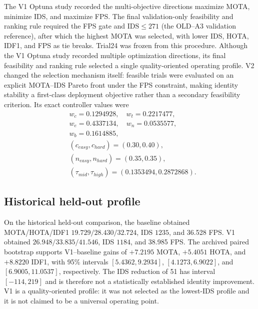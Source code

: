 The V1 Optuna study recorded the multi-objective directions maximize MOTA,
minimize IDS, and maximize FPS. The final validation-only feasibility and
ranking rule required the FPS gate and $\mathrm{IDS}\leq271$ (the OLD--A3
validation reference), after which the highest MOTA was selected, with lower
IDS, HOTA, IDF1, and FPS as tie breaks. Trial24 was frozen from this procedure.
Although the V1 Optuna study recorded multiple optimization directions, its
final feasibility and ranking rule selected a single quality-oriented operating
profile. V2 changed the selection mechanism itself: feasible trials were
evaluated on an explicit MOTA--IDS Pareto front under the FPS constraint,
making identity stability a first-class deployment objective rather than a
secondary feasibility criterion. Its exact controller values
were
\begin{equation*}
\begin{split}
&w_c=0.1294928,\quad w_t=0.2217477,\\
&w_e=0.4337134,\quad w_n=0.0535577,\\
&w_b=0.1614885,\\
&(c_{easy},c_{hard})=(0.30,0.40),\\
&(n_{easy},n_{hard})=(0.35,0.35),\\
&(\tau_{mid},\tau_{high})=(0.1353494,0.2872868).
\end{split}
\end{equation*}

\subsection{Historical held-out profile}
On the historical held-out comparison, the baseline obtained MOTA/HOTA/IDF1
$19.729/28.430/32.724$, IDS $1235$, and 36.528 FPS. V1 obtained
$26.948/33.835/41.546$, IDS $1184$, and 38.985 FPS. The archived paired
bootstrap supports V1--baseline gains of $+7.2195$ MOTA, $+5.4051$ HOTA, and
$+8.8220$ IDF1, with 95\% intervals $[5.4362,9.2934]$,
$[4.1273,6.9022]$, and $[6.9005,11.0537]$, respectively. The IDS reduction
of 51 has interval $[-114,219]$ and is therefore not a statistically
established identity improvement. V1 is a quality-oriented profile: it was
not selected as the lowest-IDS profile and it is not claimed to be a universal
operating point.
